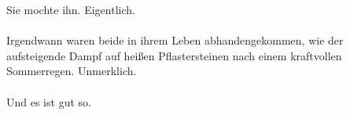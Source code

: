 {Sie mochte ihn. Eigentlich.}\\\\

Irgendwann waren beide in ihrem Leben abhandengekommen, wie der aufsteigende Dampf auf heißen Pflastersteinen nach einem kraftvollen Sommerregen. Unmerklich.\\\\

Und es ist gut so.